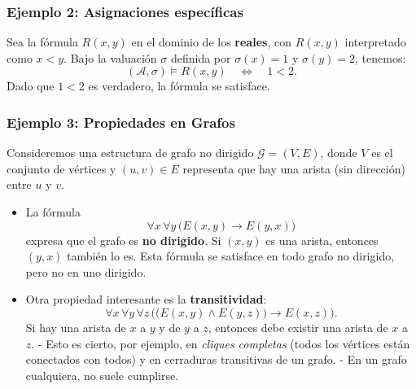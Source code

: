 \subsubsection*{Ejemplo 2: Asignaciones específicas}
Sea la fórmula $R(x,y)$ en el dominio de los \textbf{reales}, con $R(x,y)$ interpretado como $x < y$. Bajo la valuación $\sigma$ definida por $\sigma(x)=1$ y $\sigma(y)=2$, tenemos:
\[
    (\mathcal{A}, \sigma) \models R(x,y) \quad \Longleftrightarrow \quad 1 < 2.
\]
Dado que $1 < 2$ es verdadero, la fórmula se satisface.

\subsubsection*{Ejemplo 3: Propiedades en Grafos}
Consideremos una estructura de grafo no dirigido $\mathcal{G} = (V, E)$, donde $V$ es el conjunto de vértices y $(u,v) \in E$ representa que hay una arista (sin dirección) entre $u$ y $v$. 

\begin{itemize}
\item La fórmula
\[
    \forall x \,\forall y \,\bigl(E(x, y) \rightarrow E(y, x)\bigr)
\]
expresa que el grafo es \textbf{no dirigido}. Si $(x,y)$ es una arista, entonces $(y,x)$ también lo es. Esta fórmula se satisface en todo grafo no dirigido, pero no en uno dirigido.

\item Otra propiedad interesante es la \textbf{transitividad}:
\[
    \forall x \,\forall y \,\forall z\,\bigl(\bigl(E(x,y) \land E(y,z)\bigr) \rightarrow E(x,z)\bigr).
\]
Si hay una arista de $x$ a $y$ y de $y$ a $z$, entonces debe existir una arista de $x$ a $z$.  
   - Esto es cierto, por ejemplo, en \emph{cliques completas} (todos los vértices están conectados con todos) y en cerraduras transitivas de un grafo.  
   - En un grafo cualquiera, no suele cumplirse.
\end{itemize}





